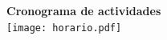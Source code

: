 \documentclass[12pt, a4paper]{article}
\def\se{$ $\\}		%
\renewcommand{\arraystretch}{2.5}
\begin{document}
\begin{center}{\LARGE\bf Cronograma de actividades}\\ %
%
%
%
%
%
%
%
%
%
%
\hspace*{20pt}\texttt{[image: horario.pdf]}
\end{center}
\end{document}
